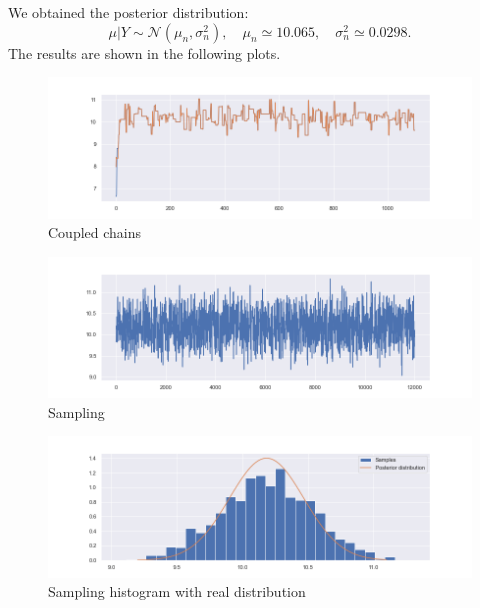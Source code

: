 \documentclass[11pt,a4paper,oneside]{report}
\begin{document}
We obtained the posterior distribution:
$$  
\mu | Y \sim \mathcal{N}(\mu_n, \sigma^2_n), 
\quad \mu_n  \simeq 10.065,
\quad \sigma^2_n \simeq 0.0298.
$$
The results are shown in the following plots.
\begin{figure}[h!]
	\centering
	\includegraphics[width=\textwidth]{abc_coupling/coupling_abc_univ_chain_meeeting}	
	\caption{Coupled chains}
	\label{complete1}
	
\end{figure}

\begin{figure}[h!]
	\centering
	\includegraphics[width=\textwidth]{abc_coupling/coupling_abc_univ_sampling}
	\caption{Sampling}
	\label{complete2}
\end{figure}

\begin{figure}[h!]
	\centering
	\includegraphics[width=\textwidth]{abc_coupling/coupling_abc_univ_histogram_posterior}
	\caption{Sampling histogram with real distribution}  
	\label{complete3}
\end{figure}
\end{document}
